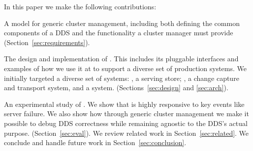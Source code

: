 In this paper we make the following contributions:
\squishlist
\item A model for generic cluster management, including both defining the common
components of a DDS and the functionality a cluster manager must provide (Section~\ref{sec:requirements}).
\item The design and implementation of \helix.  This includes its pluggable
interfaces and examples of how we use
it at \linkedin to support a diverse set of production systems. 
We initially targeted a diverse set of systems: \ES, a serving store; \databus, a change capture and 
transport system, and a \seas system.  (Sections~\ref{sec:design} and \ref{sec:arch}).
\item An experimental study of \helix.  We show that \helix is highly responsive to
key events like server failure.  We also show how through generic cluster
management we make it possible to debug DDS correctness while remaining
agnostic to the DDS's actual purpose. (Section~\ref{sec:eval}).  
\squishend
We review related work in Section~\ref{sec:related}.  We conclude and handle
future work in Section~\ref{sec:conclusion}.

